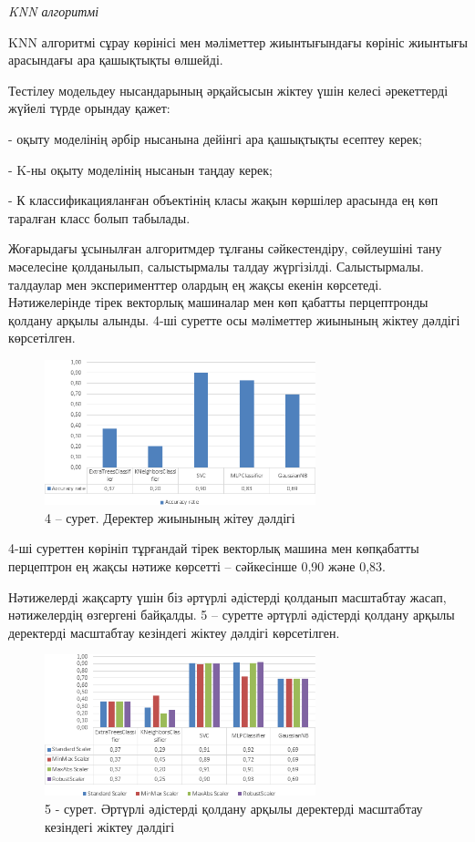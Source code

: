 \begin{multicols}{2}
\emph{KNN алгоритмі}

KNN алгоритмі сұрау көрінісі мен мәліметтер жиынтығындағы көрініс
жиынтығы арасындағы ара қашықтықты өлшейді.

Тестілеу модельдеу нысандарының әрқайсысын жіктеу үшін келесі
әрекеттерді жүйелі түрде орындау қажет:

- оқыту моделінің әрбір нысанына дейінгі ара қашықтықты есептеу керек;

- K-ны оқыту моделінің нысанын таңдау керек;

- К классификацияланған объектінің класы жақын көршілер арасында ең көп
таралған класс болып табылады.

Жоғарыдағы ұсынылған алгоритмдер тұлғаны сәйкестендіру, сөйлеушіні тану
мәселесіне қолданылып, салыстырмалы талдау жүргізілді. Салыстырмалы.
талдаулар мен эксперименттер олардың ең жақсы екенін көрсетеді.
Нәтижелерінде тірек векторлық машиналар мен көп қабатты перцептронды
қолдану арқылы алынды. 4-ші суретте осы мәліметтер жиынының жіктеу
дәлдігі көрсетілген.
\end{multicols}

\begin{figure}[H]
	\centering
	\includegraphics[width=0.7\textwidth]{media/ict/image8}
	\caption*{4 -- сурет. Деректер жиынының жітеу дәлдігі}
\end{figure}

\begin{multicols}{2}
4-ші суреттен көрініп тұрғандай тірек векторлық машина мен көпқабатты
перцептрон ең жақсы нәтиже көрсетті -- сәйкесінше 0,90 және 0,83.

Нәтижелерді жақсарту үшін біз әртүрлі әдістерді қолданып масштабтау
жасап, нәтижелердің өзгергені байқалды. 5 -- суретте әртүрлі әдістерді
қолдану арқылы деректерді масштабтау кезіндегі жіктеу дәлдігі
көрсетілген.
\end{multicols}

\begin{figure}[H]
	\centering
	\includegraphics[width=0.7\textwidth]{media/ict/image9}
	\caption*{5 - сурет. Әртүрлі әдістерді қолдану арқылы деректерді масштабтау кезіндегі жіктеу дәлдігі}
\end{figure}

